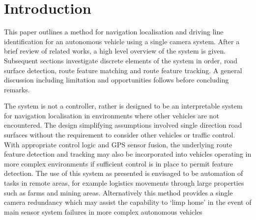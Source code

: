 \documentclass[]{aiaa-tc}%
\begin{document}

\newpage
\section{Introduction} \label{sect:intro}

%

This paper outlines a method for navigation localisation and driving line identification for an autonomous vehicle using a single camera system. After a brief review of related works, a high level overview of the system is given. Subsequent sections investigate discrete elements of the system in order, road surface detection, route feature matching and route feature tracking. A general discussion including limitation and opportunities follows before concluding remarks.

The system is not a controller, rather is designed to be an interpretable system for navigation localisation in environments where other vehicles are not encountered. The design simplifying assumptions involved single direction road surfaces without the requirement to consider other vehicles or traffic control. With appropriate control logic and GPS sensor fusion, the underlying route feature detection and tracking may also be incorporated into vehicles operating in more complex environments if sufficient control is in place to permit feature detection. The use of this system as presented is envisaged to be automation of tasks in remote areas, for example logistics movements through large properties such as farms and mining areas. Alternatively this method provides a single camera redundancy which may assist the capability to `limp home' in the event of main sensor system failures in more complex autonomous vehicles
\end{document}
